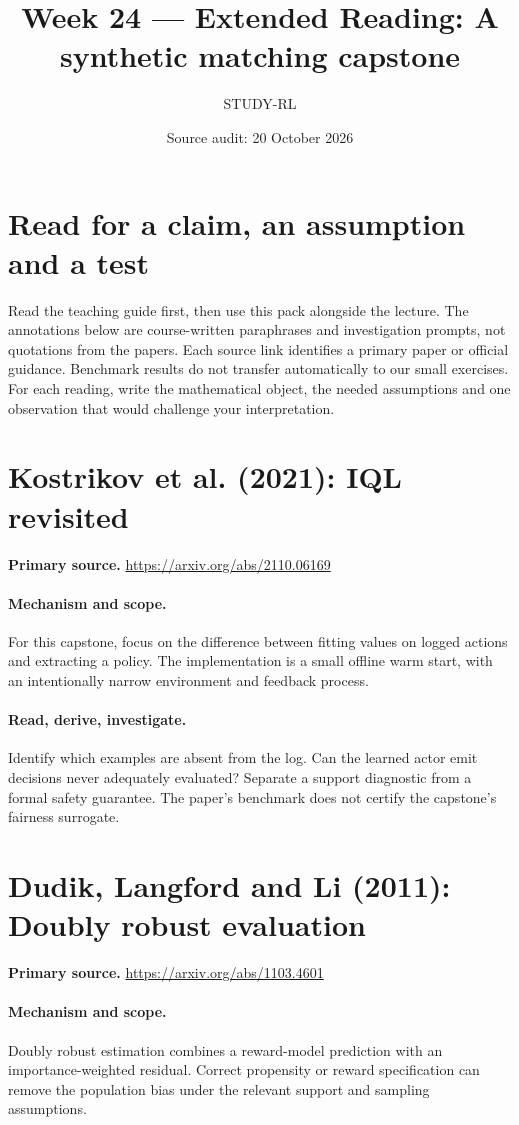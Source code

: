 \documentclass[11pt]{scrartcl}
\title{Week 24 --- Extended Reading: A synthetic matching capstone}
\author{STUDY-RL}
\date{Source audit: 20 October 2026}
\begin{document}
\maketitle
\section*{Read for a claim, an assumption and a test}
Read the teaching guide first, then use this pack alongside the lecture.
The annotations below are course-written paraphrases and investigation prompts,
not quotations from the papers. Each source link identifies a primary paper
or official guidance. Benchmark results do not transfer automatically to our
small exercises. For each reading, write the mathematical object, the needed
assumptions and one observation that would challenge your interpretation.

\section{Kostrikov et al. (2021): IQL revisited}
\noindent\textbf{Primary source.} \url{https://arxiv.org/abs/2110.06169}

\paragraph{Mechanism and scope.} For this capstone, focus on the difference between fitting values on logged actions and extracting a policy. The implementation is a small offline warm start, with an intentionally narrow environment and feedback process.

\paragraph{Read, derive, investigate.} Identify which examples are absent from the log. Can the learned actor emit decisions never adequately evaluated? Separate a support diagnostic from a formal safety guarantee. The paper's benchmark does not certify the capstone's fairness surrogate.

\section{Dudik, Langford and Li (2011): Doubly robust evaluation}
\noindent\textbf{Primary source.} \url{https://arxiv.org/abs/1103.4601}

\paragraph{Mechanism and scope.} Doubly robust estimation combines a reward-model prediction with an importance-weighted residual. Correct propensity or reward specification can remove the population bias under the relevant support and sampling assumptions.
\end{document}
